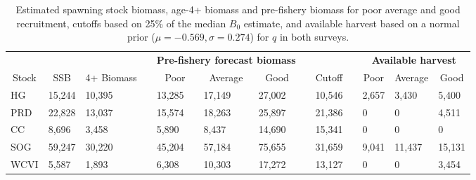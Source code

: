 %
\begin{table}[!tbp]
 \small
 \caption{Estimated spawning stock biomass,  age-4+ biomass and pre-fishery biomass for poor average and good recruitment,  cutoffs based on 25\% of the median $B_0$ estimate, and available harvest based on a normal prior ($\mu=-0.569,\sigma=0.274$) for $q$ in both surveys.\label{TableCatchAdvice}} 
 \begin{center}
 \begin{tabular}{lllclllclclll}\hline\hline
\multicolumn{3}{c}{\bfseries }&
\multicolumn{1}{c}{\bfseries }&
\multicolumn{3}{c}{\bfseries Pre-fishery forecast biomass}&
\multicolumn{1}{c}{\bfseries }&
\multicolumn{1}{c}{\bfseries }&
\multicolumn{1}{c}{\bfseries }&
\multicolumn{3}{c}{\bfseries Available harvest}
\tabularnewline \cline{1-13}
\multicolumn{1}{c}{Stock}&\multicolumn{1}{c}{SSB}&\multicolumn{1}{c}{4+ Biomass}&\multicolumn{1}{c}{}&\multicolumn{1}{c}{Poor}&\multicolumn{1}{c}{Average}&\multicolumn{1}{c}{Good}&\multicolumn{1}{c}{}&\multicolumn{1}{c}{Cutoff}&\multicolumn{1}{c}{}&\multicolumn{1}{c}{Poor}&\multicolumn{1}{c}{Average}&\multicolumn{1}{c}{Good}\tabularnewline
\hline
HG&15,244&10,395&&13,285&17,149&27,002&&10,546&& 2,657& 3,430& 5,400\tabularnewline
PRD&22,828&13,037&&15,574&18,263&25,897&&21,386&&     0&     0& 4,511\tabularnewline
CC& 8,696& 3,458&& 5,890& 8,437&14,690&&15,341&&     0&     0&     0\tabularnewline
SOG&59,247&30,220&&45,204&57,184&75,655&&31,659&& 9,041&11,437&15,131\tabularnewline
WCVI& 5,587& 1,893&& 6,308&10,303&17,272&&13,127&&     0&     0& 3,454\tabularnewline
\hline
\end{tabular}

\end{center}

\end{table}


